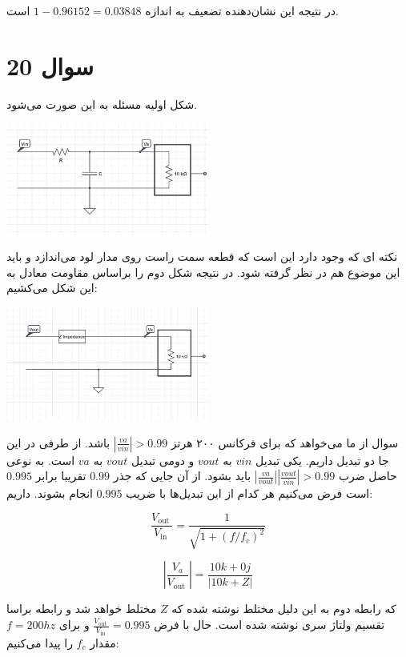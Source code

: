 \documentclass[12pt]{article}
\begin{document}
در نتیجه این نشان‌دهنده تضعیف به اندازه
$1 - 0.96152 = 0.03848$
است.


\newpage

\section*{سوال 20}

شکل اولیه مسئله به این صورت می‌شود.

\begin{center}
	\includegraphics[width = 0.5\textwidth]{images/3.png}
\end{center}

نکته ای که وجود دارد این است که قطعه سمت راست روی مدار لود می‌اندازد و باید این موضوع هم در نظر گرفته شود. در نتیجه شکل دوم را براساس مقاومت معادل به این شکل می‌کشیم:

\begin{center}
	\includegraphics[width = 0.5\textwidth]{images/4.png}
\end{center}

سوال از ما می‌خواهد که برای فرکانس ۲۰۰ هرتز
$|\frac{va}{vin}| >0.99$
باشد. از طرفی در این جا دو تبدیل داریم. یکی تبدیل $vin$ به $vout$ و دومی تبدیل $vout$ به $va$ است. به نوعی حاصل ضرب
$|\frac{va}{vout}| |\frac{vout}{vin}| > 0.99$
باید بشود. از آن جایی که جذر $0.99$ تقریبا برابر $0.995$ است فرض می‌کنیم هر کدام از این تبدیل‌ها با ضریب $0.995$ انجام بشوند. داریم:

$$
\frac{V_{\text {out }}}{V_{\text {in }}}=\frac{1}{\sqrt{1+\left(f / f_{c}\right)^{2}}}
$$

$$
\left|\frac{V_{a}}{V_{\text {out }}}\right|=\frac{10 k+0 j}{\left|10 k+Z\right|}
$$

که رابطه دوم به این دلیل مختلط نوشته شده که $Z$ مختلط خواهد شد و رابطه براسا تقسیم ولتاژ سری نوشته شده است. حال با فرض
$\frac{V_{\text {out }}}{V_{\text {in }}} = 0.995$
و برای $f=200hz$ مقدار $f_c$ را پیدا می‌کنیم:
\end{document}
